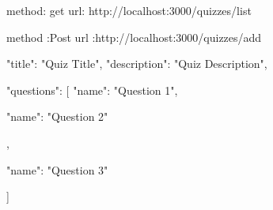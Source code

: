 method: get
url: http://localhost:3000/quizzes/list

method :Post
url :http://localhost:3000/quizzes/add

{
  "title": "Quiz Title",
  "description": "Quiz Description",

  "questions": [
    {
      "name": "Question 1"},
    {
      "name": "Question 2"
    
    },
    {
      "name": "Question 3"
     
    }
  ]
}


